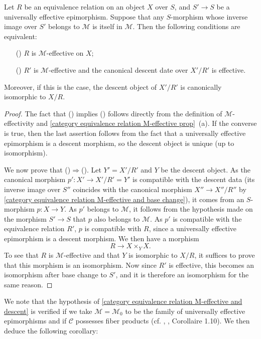 \begin{proposition}\label{category equivalence relation M-effective and descent}
Let $R$ be an equivalence relation on an object $X$ over $S$, and $S'\to S$ be a universally effective epimorphism. Suppose that any $S$-morphism whose inverse image over $S'$ belongs to $\mathcal{M}$ is itself in $\mathcal{M}$. Then the following conditions are equivalent:
\begin{enumerate}
    \item[(\rmnum{1})] $R$ is $\mathcal{M}$-effective on $X$;
    \item[(\rmnum{2})] $R'$ is $\mathcal{M}$-effective and the canonical descent date over $X'/R'$ is effective.
\end{enumerate}
Moreover, if this is the case, the descent object of $X'/R'$ is canonically isomorphic to $X/R$.
\end{proposition}
\begin{proof}
The fact that () implies () follows directly from the definition of $\mathcal{M}$-effectivity and \cref{category equivalence relation M-effective prop}~(a). If the converse is true, then the last assertion follows from the fact that a universally effective epimorphism is a descent morphism, so the descent object is unique (up to isomorphism).\par
We now prove that ()$\Rightarrow$(). Let $Y'=X'/R'$ and $Y$ be the descent object. As the canonical morphism $p':X'\to X'/R'=Y'$ is compatible with the descent data (its inverse image over $S''$ coincides with the canonical morphism $X''\to X''/R''$ by \cref{category equivalence relation M-effective and base change}), it comes from an $S$-morphism $p:X\to Y$. As $p'$ belongs to $\mathcal{M}$, it follows from the hypothesis made on the morphism $S'\to S$ that $p$ also belongs to $\mathcal{M}$. As $p'$ is compatible with the equivalence relation $R'$, $p$ is compatible with $R$, since a universally effective epimorphism is a descent morphism. We then have a morphism
\[R\to X\times_YX.\]
To see that $R$ is $\mathcal{M}$-effective and that $Y$ is isomorphic to $X/R$, it suffices to prove that this morphism is an isomorphism. Now since $R'$ is effective, this becomes an isomorphism after base change to $S'$, and it is therefore an isomorphism for the same reason.
\end{proof}

We note that the hypothesis of \cref{category equivalence relation M-effective and descent} is verified if we take $\mathcal{M}=\mathcal{M}_0$ to be the family of universally effective epimorphisms and if $\mathcal{C}$ possesses fiber products (cf. \cite{SGA3}, , Corollaire 1.10). We then deduce the following corollary:

